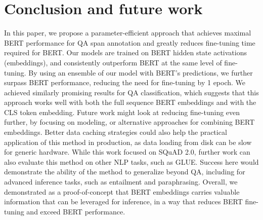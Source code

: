 \section{Conclusion and future work}

In this paper, we propose a parameter-efficient approach that achieves maximal BERT performance for QA span annotation and greatly reduces fine-tuning time required for BERT. Our models are trained on BERT hidden state activations (embeddings), and consistently outperform BERT at the same level of fine-tuning. By using an ensemble of our model with BERT’s predictions, we further surpass BERT performance, reducing the need for fine-tuning by 1 epoch. We achieved similarly promising results for QA classification, which suggests that this approach works well with both the full sequence BERT embeddings and with the CLS token embedding. Future work might look at reducing fine-tuning even further, by focusing on modeling, or alternative approaches for combining BERT embeddings. Better data caching strategies could also help the practical application of this method in production, as data loading from disk can be slow for generic hardware. While this work focused on SQuAD 2.0, further work can also evaluate this method on other NLP tasks, such as GLUE. Success here would demonstrate the ability of the method to generalize beyond QA, including for advanced inference tasks, such as entailment and paraphrasing. Overall, we demonstrated as a proof-of-concept that BERT embeddings carries valuable information that can be leveraged for inference, in a way that reduces BERT fine-tuning and exceed BERT performance.